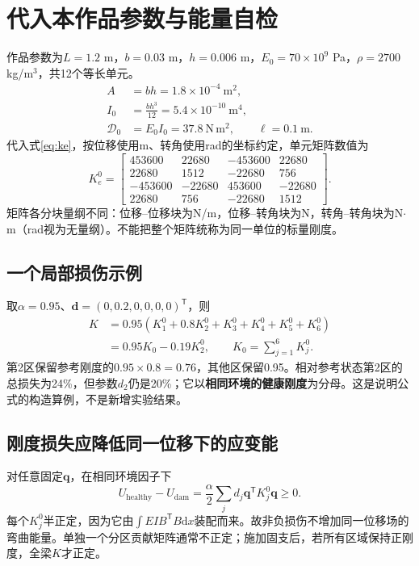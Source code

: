 \documentclass[UTF8,a4paper,11pt,fontset=fandol]{ctexart}
\numberwithin{equation}{section}
\newcommand{\dd}{\mathrm d}
\newcommand{\T}{^{\mathsf T}}
\newcommand{\EI}{\mathcal D}
\begin{document}
\newpage
\section{代入本作品参数与能量自检}
作品参数为$L=1.2$ m，$b=0.03$ m，$h=0.006$ m，$E_0=70\times10^9$ Pa，$\rho=2700$ kg/m$^3$，共12个等长单元。
\begin{align}
A&=bh=1.8\times10^{-4}\ \mathrm{m^2},\\
I_0&=\frac{bh^3}{12}=5.4\times10^{-10}\ \mathrm{m^4},\\
\EI_0&=E_0I_0=37.8\ \mathrm{N\,m^2},\qquad \ell=0.1\ \mathrm m.
\end{align}
代入式\eqref{eq:ke}，按位移使用m、转角使用rad的坐标约定，单元矩阵数值为
\begin{equation}
K_e^0=\begin{bmatrix}
453600&22680&-453600&22680\\
22680&1512&-22680&756\\
-453600&-22680&453600&-22680\\
22680&756&-22680&1512
\end{bmatrix}.
\end{equation}
矩阵各分块量纲不同：位移--位移块为N/m，位移--转角块为N，转角--转角块为N$\cdot$m（rad视为无量纲）。不能把整个矩阵统称为同一单位的标量刚度。
\subsection{一个局部损伤示例}
取$\alpha=0.95$、$\bm d=(0,0.2,0,0,0,0)\T$，则
\begin{align}
K&=0.95(K_1^0+0.8K_2^0+K_3^0+K_4^0+K_5^0+K_6^0)\\
&=0.95K_0-0.19K_2^0,\qquad K_0=\sum_{j=1}^{6}K_j^0.
\end{align}
第2区保留参考刚度的$0.95\times0.8=0.76$，其他区保留0.95。相对参考状态第2区的总损失为24\%，但参数$d_2$仍是20\%；它以\textbf{相同环境的健康刚度}为分母。这是说明公式的构造算例，不是新增实验结果。
\subsection{刚度损失应降低同一位移下的应变能}
对任意固定$\bm q$，在相同环境因子下
\begin{equation}
U_{\mathrm{healthy}}-U_{\mathrm{dam}}
=\frac{\alpha}{2}\sum_jd_j\bm q\T K_j^0\bm q\ge0.
\end{equation}
每个$K_j^0$半正定，因为它由$\int EI B\T B\dd x$装配而来。故非负损伤不增加同一位移场的弯曲能量。单独一个分区贡献矩阵通常不正定；施加固支后，若所有区域保持正刚度，全梁$K$才正定。
\end{document}
